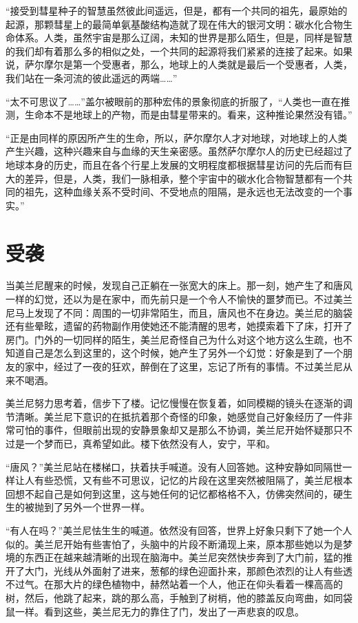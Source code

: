 “接受到彗星种子的智慧虽然彼此间遥远，但是，都有一个共同的祖先，最原始的起源，那颗彗星上的最简单氨基酸结构造就了现在伟大的银河文明：碳水化合物生命体系。人类，虽然宇宙是那么辽阔，未知的世界是那么陌生，但是，同样是智慧的我们却有着那么多的相似之处，一个共同的起源将我们紧紧的连接了起来。如果说，萨尔摩尔是第一个受惠者，那么，地球上的人类就是最后一个受惠者，人类，我们站在一条河流的彼此遥远的两端……”

“太不可思议了……”盖尔被眼前的那种宏伟的景象彻底的折服了，“人类也一直在推测，生命本不是地球上的产物，而是由彗星带来的。看来，这种推论果然没有错。”

“正是由同样的原因所产生的生命，所以，萨尔摩尔人才对地球，对地球上的人类产生兴趣，这种兴趣来自与血缘的天生亲密感。虽然萨尔摩尔人的历史已经超过了地球本身的历史，而且在各个行星上发展的文明程度都根据彗星访问的先后而有巨大的差异，但是，人类，我们一脉相承，整个宇宙中的碳水化合物智慧都有一个共同的祖先，这种血缘关系不受时间、不受地点的阻隔，是永远也无法改变的一个事实。”

\chapter{受袭}

当美兰尼醒来的时候，发现自己正躺在一张宽大的床上。那一刻，她产生了和唐风一样的幻觉，还以为是在家中，而先前只是一个令人不愉快的噩梦而已。不过美兰尼马上发现了不同：周围的一切非常陌生，而且，唐风也不在身边。美兰尼的脑袋还有些晕眩，遗留的药物副作用使她还不能清醒的思考，她摸索着下了床，打开了房门。门外的一切同样的陌生，美兰尼奇怪自己为什么对这个地方这么生疏，也不知道自己是怎么到这里的，这个时候，她产生了另外一个幻觉：好象是到了一个朋友的家中，经过了一夜的狂欢，醉倒在了这里，忘记了所有的事情。不过美兰尼从来不喝酒。

美兰尼努力思考着，信步下了楼。记忆慢慢在恢复着，如同模糊的镜头在逐渐的调节清晰。美兰尼下意识的在抵抗着那个奇怪的印象，她感觉自己好象经历了一件非常可怕的事件，但眼前出现的安静景象却又是那么不协调，美兰尼开始怀疑那只不过是一个梦而已，真希望如此。楼下依然没有人，安宁，平和。

“唐风？”美兰尼站在楼梯口，扶着扶手喊道。没有人回答她。这种安静如同隔世一样让人有些恐慌，又有些不可思议，记忆的片段在这里突然被阻隔了，美兰尼根本回想不起自己是如何到这里，这与她任何的记忆都格格不入，仿佛突然间的，硬生生的被抛到了另外一个世界一样。

“有人在吗？”美兰尼怯生生的喊道。依然没有回答，世界上好象只剩下了她一个人似的。美兰尼开始有些害怕了，头脑中的片段不断涌现上来，原本那些她以为是梦境的东西正在越来越清晰的出现在脑海中。美兰尼突然快步奔到了大门前，猛的推开了大门，光线从外面射了进来，葱郁的绿色迎面扑来，那颜色浓烈的让人有些透不过气。在那大片的绿色植物中，赫然站着一个人，他正在仰头看着一棵高高的树，然后，他跳了起来，跳的那么高，手触到了树梢，他的膝盖反向弯曲，如同袋鼠一样。看到这些，美兰尼无力的靠住了门，发出了一声悲哀的叹息。

